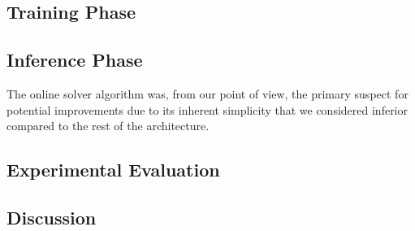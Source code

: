 \subsection{Training Phase}

\subsection{Inference Phase}

The online solver algorithm was, from our point of view, the primary suspect for potential improvements due to its inherent simplicity that we considered inferior compared to the rest of the architecture.

\subsection{Experimental Evaluation}

\subsection{Discussion}